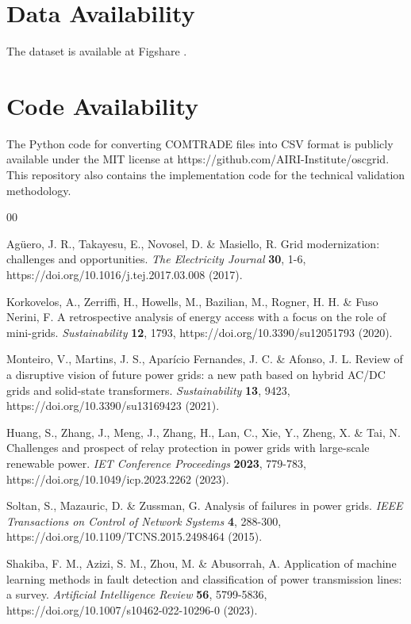 \documentclass{article}
\begin{document}
\section*{Data Availability}

The dataset is available at Figshare \cite{figshare}.

\section*{Code Availability}

The Python code for converting COMTRADE files into CSV format is publicly available under the MIT license at https://github.com/AIRI-Institute/oscgrid. This repository also contains the implementation code for the technical validation methodology.

\begin{thebibliography}{00}

 Agüero, J. R., Takayesu, E., Novosel, D. \& Masiello, R. Grid modernization: challenges and opportunities. \emph{The Electricity Journal} \textbf{30}, 1-6, https://doi.org/10.1016/j.tej.2017.03.008 (2017).

 Korkovelos, A., Zerriffi, H., Howells, M., Bazilian, M., Rogner, H. H. \& Fuso Nerini, F. A retrospective analysis of energy access with a focus on the role of mini-grids. \emph{Sustainability} \textbf{12}, 1793, https://doi.org/10.3390/su12051793 (2020).

 Monteiro, V., Martins, J. S., Aparício Fernandes, J. C. \& Afonso, J. L. Review of a disruptive vision of future power grids: a new path based on hybrid AC/DC grids and solid-state transformers. \emph{Sustainability} \textbf{13}, 9423, https://doi.org/10.3390/su13169423 (2021).

 Huang, S., Zhang, J., Meng, J., Zhang, H., Lan, C., Xie, Y., Zheng, X. \& Tai, N. Challenges and prospect of relay protection in power grids with large-scale renewable power. \emph{IET Conference Proceedings} \textbf{2023}, 779-783, https://doi.org/10.1049/icp.2023.2262 (2023).

 Soltan, S., Mazauric, D. \& Zussman, G. Analysis of failures in power grids. \emph{IEEE Transactions on Control of Network Systems} \textbf{4}, 288-300, https://doi.org/10.1109/TCNS.2015.2498464 (2015).

 Shakiba, F. M., Azizi, S. M., Zhou, M. \& Abusorrah, A. Application of machine learning methods in fault detection and classification of power transmission lines: a survey. \emph{Artificial Intelligence Review} \textbf{56}, 5799-5836, https://doi.org/10.1007/s10462-022-10296-0 (2023).


\end{thebibliography}
\end{document}
